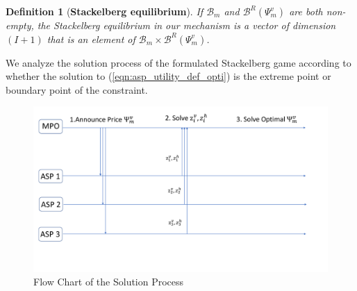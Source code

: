 \documentclass[conference]{IEEEtran}
\newtheorem{definition}{Definition}
\begin{document}
\begin{definition}[\textbf{Stackelberg equilibrium}] \label{def:stackelberg_equilibrium}
If $\mathcal{B}_{m}$ and $\mathcal{B}^R(\Psi_m^v)$ are both non-empty, the Stackelberg equilibrium in our mechanism is a vector of dimension $(I+1)$ that is an element of $\mathcal{B}_m  \times \mathcal{B}^R(\Psi_m^v)$.
\end{definition}
We analyze the solution process of the formulated Stackelberg game according to whether the solution to (\ref{eqn:asp_utility_def_opti}) is the extreme point or boundary point of the constraint.
\begin{figure}[h]
    \centering
    \includegraphics[width=\columnwidth]{5GDDoS_Game_Flow_Chart.pdf}
    \caption{Flow Chart of the Solution Process}
    \label{fig:flow_chart}
\end{figure}
\end{document}
